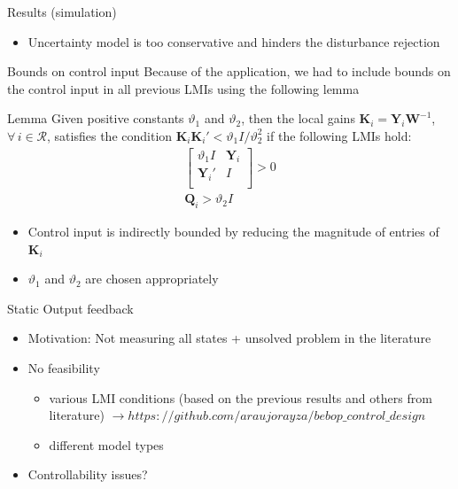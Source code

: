 \begin{frame}{Results (simulation)}
\begin{minipage}{0.45\textwidth}
    \end{minipage}
    \begin{itemize}
        \item Uncertainty model is too conservative and hinders the disturbance rejection
    \end{itemize}
\end{frame}

\begin{frame}{Bounds on control input}
Because of the application, we had to include bounds on the control input in all previous LMIs using the following lemma\autocite{Assuncao2007}
\begin{block}{Lemma}
Given positive constants $\vartheta_1$ and $\vartheta_2$, then the local gains $\mathbf{K}_{i}=\mathbf{Y}_{i}\mathbf W^{-1}$, $\forall\,i \in \mathcal{R}$, satisfies the condition $\mathbf{K}_{i}\mathbf{K}_{i}'<\vartheta_1I/\vartheta_2^2$ if the following LMIs hold:
\begin{equation}
    \label{umin}
\begin{gathered}
\left[ \begin{array}{cc} \vartheta_1 I & \mathbf{Y}_{i} \\
\mathbf{Y}_{i}'  & I \\
\end{array}\right] > 0   \\
{\mathbf Q}_i > \vartheta_2 I
\end{gathered}
\end{equation}
\end{block}
\begin{itemize}
    \item Control input is indirectly bounded by reducing the magnitude of entries of $\mathbf{K}_{i}$
    \item $\vartheta_1$ and $\vartheta_2$ are chosen appropriately 
\end{itemize}
\end{frame}

\begin{frame}{Static Output feedback}
\begin{itemize}
    \item Motivation: Not measuring all states + unsolved problem in the literature
    \item No feasibility
    \begin{itemize}
        \item various LMI conditions (based on the previous results and others from literature) $ \longrightarrow https://github.com/araujorayza/bebop\_control\_design$
        \item different model types
        
    \end{itemize}
    \item Controllability issues?
\end{itemize}
\end{frame}

